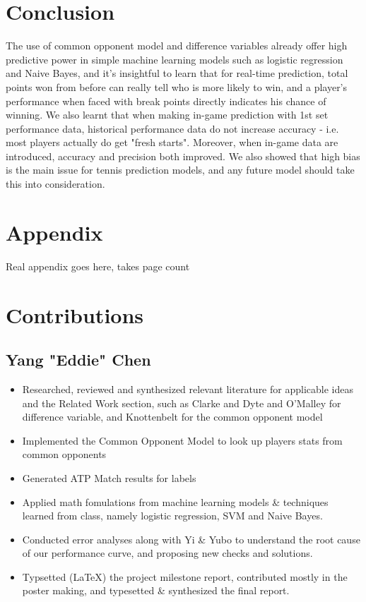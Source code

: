 \documentclass[paper=a4, fontsize=10pt]{scrartcl} %
\numberwithin{equation}{section} %
\numberwithin{figure}{section} %
\numberwithin{table}{section} %
\begin{document}
\section{Conclusion}
The use of common opponent model and difference variables already offer high predictive power in simple machine learning models such as logistic regression and Naive Bayes, and it's insightful to learn that for real-time prediction, total points won from before can really tell who is more likely to win, and a player's performance when faced with break points directly indicates his chance of winning. We also learnt that when making in-game prediction with 1st set performance data, historical performance data do not increase accuracy - i.e. most players actually do get "fresh starts".  Moreover, when in-game data are introduced, accuracy and precision both improved. We also showed that high bias is the main issue for tennis prediction models, and any future model should take this into consideration. 
\section{Appendix}
Real appendix goes here, takes page count

\section{Contributions}
\subsection{Yang "Eddie" Chen}
\begin{itemize}
\item Researched, reviewed and synthesized relevant literature for applicable ideas and the Related Work section, such as Clarke and Dyte \cite{Clarke2010} and O'Malley \cite{omalley} for difference variable, and Knottenbelt \cite{KNOTTENBELT20123820} for the common opponent model
\item Implemented the Common Opponent Model to look up players stats from common opponents
\item Generated ATP Match results for labels
\item Applied math fomulations from machine learning models \& techniques learned from class, namely logistic regression, SVM and Naive Bayes. 
\item Conducted error analyses along with Yi \& Yubo to understand the root cause of our performance curve, and proposing new checks and solutions. 
\item Typsetted (\LaTeX) the project milestone report, contributed mostly in the poster making, and typesetted \& synthesized the final report. 
\end{itemize}
\end{document}
